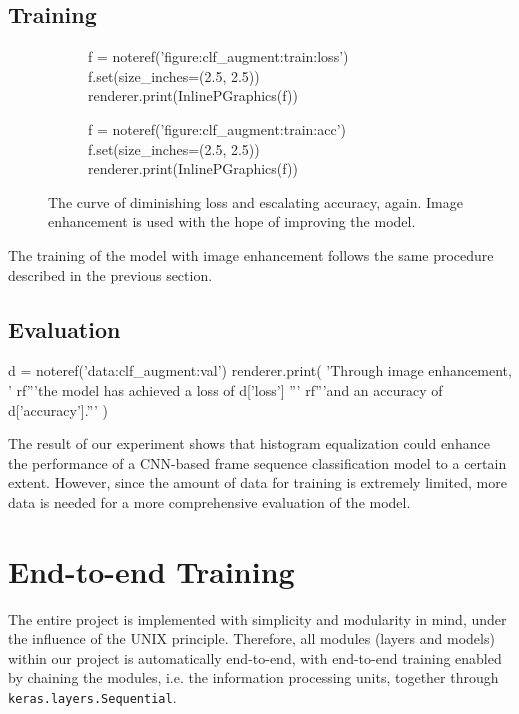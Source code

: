 \documentclass[letterpaper]{article} %
\begin{document}
\subsection{Training}
\begin{figure*}[t!]
  \centering
  \renewcommand\sffamily{}
  \begin{subfigure}[t]{.45\textwidth}
    \centering
    \begin{python}
      f = noteref('figure:clf_augment:train:loss')
      f.set(size_inches=(2.5, 2.5))
      renderer.print(InlinePGraphics(f))
    \end{python}
  \end{subfigure}
  \begin{subfigure}[t]{.45\textwidth}
    \centering
    \begin{python}
      f = noteref('figure:clf_augment:train:acc')
      f.set(size_inches=(2.5, 2.5))
      renderer.print(InlinePGraphics(f))
    \end{python}
  \end{subfigure}
  \caption{
    The curve of diminishing loss and escalating accuracy, again.
    Image enhancement is used with the hope of improving the model.
  }\label{figure:clf_augment:train}
\end{figure*}

The training of the model with image enhancement
follows the same procedure described in the previous section.

\subsection{Evaluation}
\begin{python}
  d = noteref('data:clf_augment:val')
  renderer.print(
    'Through image enhancement, '
    rf'''the model has achieved a loss of {d['loss']} ''' 
    rf'''and an accuracy of {d['accuracy']}.'''
  )
\end{python}

The result of our experiment
shows that histogram equalization
could enhance the performance of 
a CNN-based frame sequence classification model
to a certain extent.
However, since the amount of data for training
is extremely limited, more data is needed for
a more comprehensive evaluation of the model.

\section{End-to-end Training}
The entire project is implemented with
simplicity and modularity in mind,
under the influence of the UNIX principle.
Therefore, all modules (layers and models)
within our project is automatically end-to-end,
with end-to-end training enabled by
chaining the modules, i.e. the information processing units,
together through \lstinline|keras.layers.Sequential|. 
\end{document}
